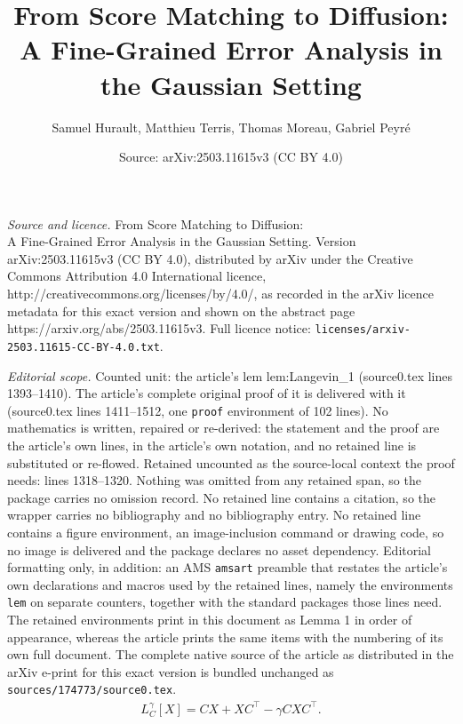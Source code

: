\documentclass[10pt,a4paper]{amsart}
\title{From Score Matching to Diffusion: \\ A Fine-Grained Error Analysis in the Gaussian Setting}
\author{Samuel Hurault, Matthieu Terris, Thomas Moreau, Gabriel Peyr\'e}
\date{Source: arXiv:2503.11615v3 (CC BY 4.0)}
\begin{document}
\maketitle

\noindent\emph{Source and licence.} From Score Matching to Diffusion: \\ A Fine-Grained Error Analysis in the Gaussian Setting. Version arXiv:2503.11615v3 (CC BY 4.0), distributed by arXiv under the Creative Commons Attribution 4.0 International licence, http://creativecommons.org/licenses/by/4.0/, as recorded in the arXiv licence metadata for this exact version and shown on the abstract page https://arxiv.org/abs/2503.11615v3. Full licence notice: \texttt{licenses/arxiv-2503.11615-CC-BY-4.0.txt}.\par\smallskip

\noindent\textit{Editorial scope.} Counted unit: the article's lem lem:Langevin\_1 (source0.tex lines 1393--1410). The article's complete original proof of it is delivered with it (source0.tex lines 1411--1512, one \texttt{proof} environment of 102 lines). No mathematics is written, repaired or re-derived: the statement and the proof are the article's own lines, in the article's own notation, and no retained line is substituted or re-flowed.  Retained uncounted as the source-local context the proof needs: lines 1318--1320.  Nothing was omitted from any retained span, so the package carries no omission record.  No retained line contains a citation, so the wrapper carries no bibliography and no bibliography entry.  No retained line contains a figure environment, an image-inclusion command or drawing code, so no image is delivered and the package declares no asset dependency.  Editorial formatting only, in addition: an AMS \texttt{amsart} preamble that restates the article's own declarations and macros used by the retained lines, namely the environments \texttt{lem} on separate counters, together with the standard packages those lines need.  The retained environments print in this document as Lemma 1 in order of appearance, whereas the article prints the same items with the numbering of its own full document.  The complete native source of the article as distributed in the arXiv e-print for this exact version is bundled unchanged as \texttt{sources/174773/source0.tex}.
\begin{align} \label{eq:inv_lyap}
    L^\gamma_C[X] = CX + XC^\top - \gamma C X C^\top .
\end{align}
\end{document}
